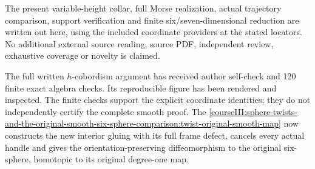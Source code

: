 The present variable-height collar, full Morse realization, actual trajectory comparison, support verification and finite six/seven-dimensional reduction are written out here, using the included coordinate providers at the stated locators. No additional external source reading, source PDF, independent review, exhaustive coverage or novelty is claimed.

The full written \(h\)-cobordism argument has received author self-check and 120 finite exact algebra checks. Its reproducible figure has been rendered and inspected. The finite checks support the explicit coordinate identities; they do not independently certify the complete smooth proof. The \cref{courseIII:sphere-twists-and-the-original-smooth-six-sphere-comparison:twist-original-smooth-map} now constructs the new interior gluing with its full frame defect, cancels every actual handle and gives the orientation-preserving diffeomorphism to the original six-sphere, homotopic to its original degree-one map.
